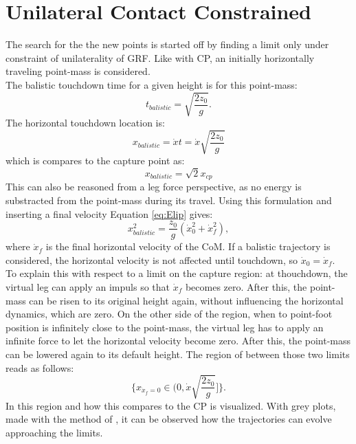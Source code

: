 \section{Unilateral Contact Constrained}
The search for the the new points is started off by finding a limit only under constraint of unilaterality of \ac{GRF}. Like with \ac{CP}, an initially horizontally traveling point-mass is considered. \\
The balistic touchdown time for a given height is for this point-mass:
\begin{equation}\label{eq:tbal}
	t_{balistic} = \sqrt{\frac{2z_0}{g}}.
\end{equation}
The horizontal touchdown location is:
\begin{equation}
	x_{balistic}= \dot{x}t=\dot{x}\sqrt{\frac{2z_0}{g}} 
\end{equation}
which is compares to the capture point as:
\begin{equation}
    x_{balistic}=\sqrt{2}x_{cp}
\end{equation}
This can also be reasoned from a leg force perspective, as no energy is substracted from the point-mass during its travel. Using this formulation and inserting a final velocity Equation \eqref{eq:Elip} gives:
\begin{equation}
   x_{balistic}^2 = \frac{z_0}{g}(\dot{x}_0^2 + \dot{x}_f^2), 
\end{equation}
where $\dot{x}_f$ is the final horizontal velocity of the \ac{CoM}. If a balistic trajectory is considered, the horizontal velocity is not affected until touchdown, so $\dot{x}_0=\dot{x}_f$. \\
To explain this with respect to a limit on the capture region: at thouchdown, the virtual leg can apply an impuls so that $\dot{x}_f$ becomes zero. After this, the point-mass can be risen to its original height again, without influencing the horizontal dynamics, which are zero. On the other side of the region, when to point-foot position is infinitely close to the point-mass, the virtual leg has to apply an infinite force to let the horizontal velocity become zero. After this, the point-mass can be lowered again to its default height. The region of between those two limits reads as follows:
\begin{equation}
\{x_{\dot{x}_f=0} \in (0, \dot{x}\sqrt{\frac{2z_0}{g}} ]\}.
\end{equation}
In  this region and how this compares to the \ac{CP} is visualized. With grey plots, made with the method of \cite{koolen2016balance}, it can be observed how the trajectories can evolve approaching the limits. 


